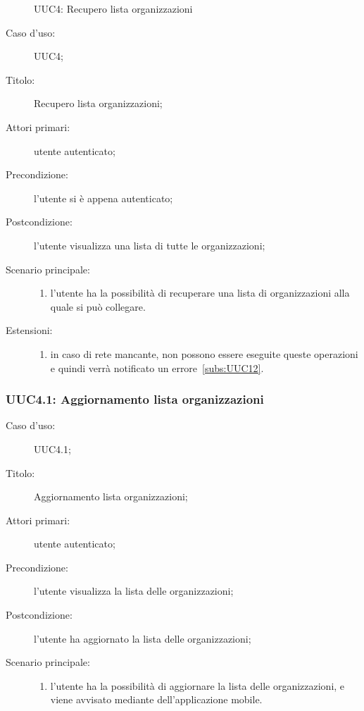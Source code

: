 \documentclass[../../../analisi-dei-requisiti.tex]{subfiles}
\begin{document}
\begin{figure}[H]
  \centering
  \caption{UUC4: Recupero lista organizzazioni}%
  \label{fig:uuc4}
\end{figure}

\begin{description}
  \item[Caso d’uso:] UUC4;
  \item[Titolo:] Recupero lista organizzazioni;
  \item[Attori primari:] utente autenticato;
  \item[Precondizione:] l'utente si è appena autenticato;
  \item[Postcondizione:] l'utente visualizza una lista di tutte le organizzazioni;
  \item[Scenario principale:]
        \begin{enumerate}
          \item l'utente ha la possibilità di recuperare una lista di organizzazioni alla quale si può collegare.
        \end{enumerate}
  \item[Estensioni:]
        \begin{enumerate}
          \item in caso di rete mancante, non possono essere eseguite queste operazioni e quindi verrà notificato un errore~\ref{subs:UUC12}.
        \end{enumerate}
\end{description}


\subsubsection{UUC4.1: Aggiornamento lista organizzazioni}%
\label{subs:UUC4.1}
\begin{description}
  \item[Caso d’uso:] UUC4.1;
  \item[Titolo:] Aggiornamento lista organizzazioni;
  \item[Attori primari:] utente autenticato;
  \item[Precondizione:] l'utente visualizza la lista delle organizzazioni;
  \item[Postcondizione:] l'utente ha aggiornato la lista delle organizzazioni;
  \item[Scenario principale:]
        \begin{enumerate}
          \item l'utente ha la possibilità di aggiornare la lista delle organizzazioni, e viene avvisato mediante  dell'applicazione mobile.
        \end{enumerate}
\end{description}
\end{document}
